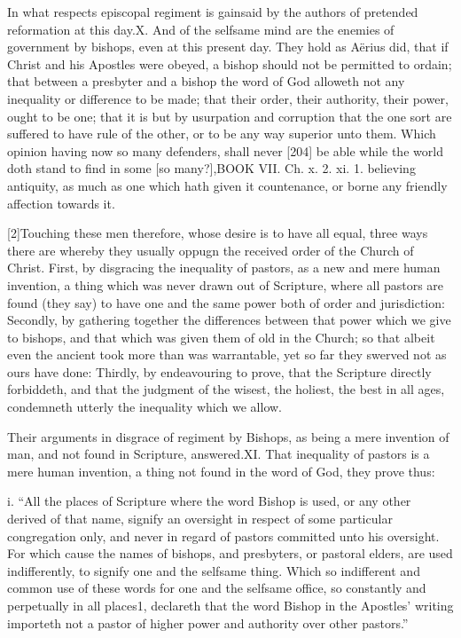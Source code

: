In what respects episcopal regiment is gainsaid by the authors of pretended reformation at this day.X. And of the selfsame mind are the enemies of government by bishops, even at this present day. They hold as Aërius did, that if Christ and his Apostles were obeyed, a bishop should not be permitted to ordain; that between a presbyter and a bishop the word of God alloweth not any inequality or difference to be made; that their order, their authority, their power, ought to be one; that it is but by usurpation and corruption that the one sort are suffered to have rule of the other, or to be any way superior unto them. Which opinion having now so many defenders, shall never [204] be able while the world doth stand to find in some [so many?],BOOK VII. Ch. x. 2. xi. 1. believing antiquity, as much as one which hath given it countenance, or borne any friendly affection towards it.

[2]Touching these men therefore, whose desire is to have all equal, three ways there are whereby they usually oppugn the received order of the Church of Christ. First, by disgracing the inequality of pastors, as a new and mere human invention, a thing which was never drawn out of Scripture, where all pastors are found (they say) to have one and the same power both of order and jurisdiction: Secondly, by gathering together the differences between that power which we give to bishops, and that which was given them of old in the Church; so that albeit even the ancient took more than was warrantable, yet so far they swerved not as ours have done: Thirdly, by endeavouring to prove, that the Scripture directly forbiddeth, and that the judgment of the wisest, the holiest, the best in all ages, condemneth utterly the inequality which we allow.

Their arguments in disgrace of regiment by Bishops, as being a mere invention of man, and not found in Scripture, answered.XI. That inequality of pastors is a mere human invention, a thing not found in the word of God, they prove thus:

i. “All the places of Scripture where the word Bishop is used, or any other derived of that name, signify an oversight in respect of some particular congregation only, and never in regard of pastors committed unto his oversight. For which cause the names of bishops, and presbyters, or pastoral elders, are used indifferently, to signify one and the selfsame thing. Which so indifferent and common use of these words for one and the selfsame office, so constantly and perpetually in all places1, declareth that the word Bishop in the Apostles’ writing importeth not a pastor of higher power and authority over other pastors.”

